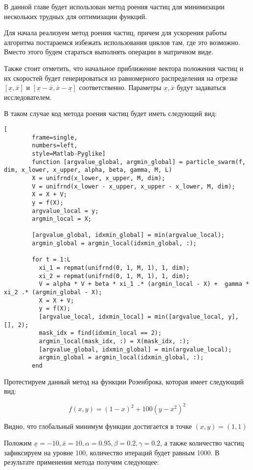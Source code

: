 \documentclass[../main.tex]{subfiles}
\begin{document}
	В данной главе будет использован метод роения частиц для минимизации нескольких трудных для оптимизации функций.
	
	Для начала реализуем метод роения частиц, причем для ускорения работы алгоритма постараемся избежать использования циклов там, где это возможно. Вместо этого будем стараться выполнять операции в матричном виде.
	
	Также стоит отметить, что начальное приближение вектора положения частиц и их скоростей будет генерироваться из равномерного распределения на отрезке $[\underline{x}, \bar{x}]$ и $[\underline{x} - \bar{x}, \bar{x} - \underline{x}]$ соответственно. Параметры $\underline{x},  \bar{x}$ будут задаваться исследователем.
	
	В таком случае код метода роения частиц будет иметь следующий вид:
	
	\begin{lstlisting}[
		frame=single,
		numbers=left,
		style=Matlab-Pyglike]
		function [argvalue_global, argmin_global] = particle_swarm(f, dim, x_lower, x_upper, alpha, beta, gamma, M, L) 
		X = unifrnd(x_lower, x_upper, M, dim);
		V = unifrnd(x_lower - x_upper, x_upper - x_lower, M, dim); 
		X = X + V;
		y = f(X);
		argvalue_local = y;
		argmin_local = X;
		
		[argvalue_global, idxmin_global] = min(argvalue_local);
		argmin_global = argmin_local(idxmin_global, :);
		
		for t = 1:L
		  xi_1 = repmat(unifrnd(0, 1, M, 1), 1, dim);
		  xi_2 = repmat(unifrnd(0, 1, M, 1), 1, dim);
	 	  V = alpha * V + beta * xi_1 .* (argmin_local - X) +  gamma * xi_2 .* (argmin_global - X);
		  X = X + V;
		  y = f(X);
		  [argvalue_local, idxmin_local] = min([argvalue_local, y], [], 2);
		  mask_idx = find(idxmin_local == 2);
		  argmin_local(mask_idx, :) = X(mask_idx, :);
		  [argvalue_global, idxmin_global] = min(argvalue_local);
		  argmin_global = argmin_local(idxmin_global, :);
		end
	\end{lstlisting}
	
	Протестируем данный метод на функции Розенброка, которая имеет следующий вид:
	
	\[f(x, y) = (1 - x)^2 + 100(y-x^2)^2\]
	
	Видно, что глобальный минимум функции достигается в точке $(x, y) = (1, 1)$
	
	Положим $\underline{x} = -10,  \bar{x} = 10, \alpha = 0.95, \beta = 0.2, \gamma=0.2$, а также количество частиц зафиксируем на уровне 100, количество итераций будет равным 1000. В результате применения метода получим следующее:
	
\end{document}
